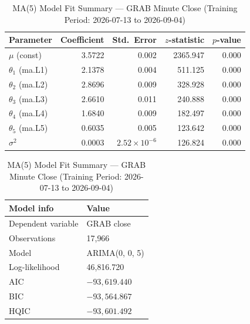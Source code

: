\documentclass{article}
\begin{document}
\begin{table}[htbp]
\centering
\caption{MA(5) Model Fit Summary — GRAB Minute Close (Training Period: 2026-07-13 to 2026-09-04)}
\label{tab:ma5-summary}
\begin{tabular}{lrrrr}
\toprule
Parameter & Coefficient & Std.\ Error & $z$-statistic & $p$-value \\
\midrule
$\mu$ (const)      & 3.5722  & 0.002 & 2365.947 & 0.000 \\
$\theta_1$ (ma.L1) & 2.1378  & 0.004 &  511.125 & 0.000 \\
$\theta_2$ (ma.L2) & 2.8696  & 0.009 &  328.928 & 0.000 \\
$\theta_3$ (ma.L3) & 2.6610  & 0.011 &  240.888 & 0.000 \\
$\theta_4$ (ma.L4) & 1.6840  & 0.009 &  182.497 & 0.000 \\
$\theta_5$ (ma.L5) & 0.6035  & 0.005 &  123.642 & 0.000 \\
$\sigma^2$         & 0.0003  & $2.52\times10^{-6}$ & 126.824 & 0.000 \\
\bottomrule
\end{tabular}
\vspace{0.5em}

\begin{tabular}{ll}
\toprule
Model info & Value \\
\midrule
Dependent variable       & GRAB close \\
Observations             & 17{,}966 \\
Model                    & ARIMA(0, 0, 5) \\
Log-likelihood           & 46{,}816.720 \\
AIC                      & $-93{,}619.440$ \\
BIC                      & $-93{,}564.867$ \\
HQIC                     & $-93{,}601.492$ \\
\bottomrule
\end{tabular}
\end{table}
\end{document}
